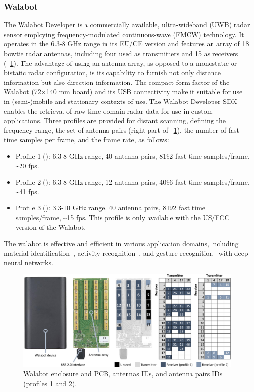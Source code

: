 \subsubsection{Walabot}
The Walabot Developer is a commercially available, ultra-wideband (UWB) radar sensor employing frequency-modulated continuous-wave (FMCW) technology. It operates in the 6.3-8 GHz range in its EU/CE version and features an array of 18 bowtie radar antennas, including four used as transmitters and 15 as receivers (\fig~\ref{fig:radar-experiments:walabot}). The advantage of using an antenna array, as opposed to a monostatic or bistatic radar configuration, is its capability to furnish not only distance information but also direction information.
The compact form factor of the Walabot (72$\times$140 mm board) and its USB connectivity make it suitable for use in (semi-)mobile and stationary contexts of use. 
The Walabot Developer SDK enables the retrieval of raw time-domain radar data for use in custom applications. Three profiles are provided for distant scanning, defining the frequency range, the set of antenna pairs (right part of \fig~\ref{fig:radar-experiments:walabot}), the number of fast-time samples per frame, and the frame rate, as follows:
\begin{itemize}
    \item Profile 1 (): 6.3-8 GHz range, 40 antenna pairs, 8192 fast-time samples/frame, \textasciitilde 20 fps.
    \item Profile 2 (): 6.3-8 GHz range, 12 antenna pairs, 4096 fast-time samples/frame, \textasciitilde 41 fps.
    \item Profile 3 (): 3.3-10 GHz range, 40 antenna pairs, 8192 fast time samples/frame, \textasciitilde 15 fps. This profile is only available with the US/FCC version of the Walabot.
\end{itemize}
The walabot is effective and efficient in various application domains, including material identification~\cite{Agresti:2019}, activity recognition~\cite{Avrahami:2018, Zhu:2018}, and gesture recognition~\cite{Zhang:2021} with deep neural networks.

\begin{figure}[tb]
    \centering
    \includegraphics[width=\linewidth]{Figures/RadarExperiments/Sensors/walabot.pdf}
    \vspace{-12pt}
    \caption{Walabot enclosure and PCB, antennas IDs, and antenna pairs IDs (profiles 1 and 2).}
    \label{fig:radar-experiments:walabot}
    \vspace{-14pt}
\end{figure}

